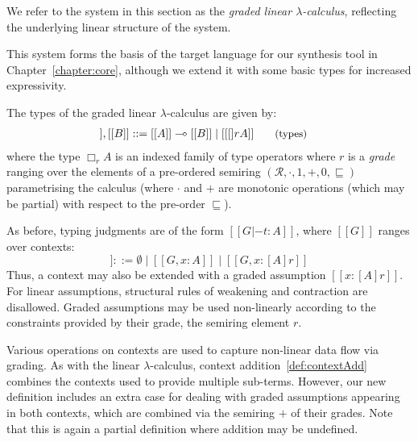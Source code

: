 We refer to the system in this section as the \textit{graded
linear $\lambda$-calculus}, reflecting the underlying linear structure of the
system.


This system forms the basis of the target language for our synthesis tool in
Chapter~\ref{chapter:core}, although we extend it with some basic types for 
increased expressivity.

The types of the graded linear $\lambda$-calculus are given by:
\begin{align*}
[[ A ]] , [[ B ]] & ::=
       [[ A ]] \multimap [[ B ]]
  \mid [[ [] r A ]]
{\small{\tag{types}}}
\end{align*}
where the type $\Box_{r} A$ is an indexed family of type operators where $r$ is
a \textit{grade} ranging over the elements of a pre-ordered semiring
$({\mathcal{R}}, \cdot, {1}, {+}, {0}, {\sqsubseteq})$ parametrising the
calculus (where $\cdot$ and $+$ are monotonic operations (which may be partial)
with respect to the pre-order $\sqsubseteq$). 

As before, typing judgments are of the form $[[ G |- t : A ]]$, where $[[ G ]]$
ranges over contexts:
\begin{equation*}
  [[ G ]] ::= \emptyset
  \mid [[ G , x : A ]]
  \mid [[ G , x : [ A ] r ]]
\tag{contexts}
\end{equation*}
Thus, a context may also be extended with a graded assumption $[[x : [A] r]]$.
For linear assumptions, structural rules of weakening and contraction are
disallowed. Graded assumptions may be used non-linearly according to the
constraints provided by their grade, the semiring element $r$. 

Various operations on contexts are used to capture non-linear data flow via
grading. As with the linear $\lambda$-calculus, context
addition~\eqref{def:contextAdd} combines the contexts used to provide multiple
sub-terms. However, our new definition includes an extra case for dealing with
graded assumptions appearing in both contexts, which are combined
via the semiring $+$ of their grades. Note that this is again a partial definition
where addition may be undefined.

